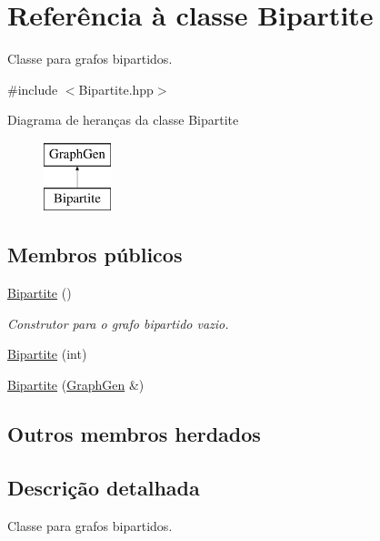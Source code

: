\hypertarget{classBipartite}{}\section{Referência à classe Bipartite}
\label{classBipartite}


Classe para grafos bipartidos.  




{\ttfamily \#include $<$Bipartite.\+hpp$>$}

Diagrama de heranças da classe Bipartite\begin{figure}[H]
\begin{center}
\leavevmode
\includegraphics[height=2.000000cm]{classBipartite}
\end{center}
\end{figure}
\subsection*{Membros públicos}
\begin{DoxyCompactItemize}
\item 
\mbox{\label{classBipartite_aebea5d6981f517fa57e073c7d5cd5fd5}} 
\hyperlink{classBipartite_aebea5d6981f517fa57e073c7d5cd5fd5}{Bipartite} ()
\begin{DoxyCompactList}\small\item\em Construtor para o grafo bipartido vazio. \end{DoxyCompactList}\item 
\hyperlink{classBipartite_a1dfec46c393c2c1b8141250d26968673}{Bipartite} (int)
\item 
\hyperlink{classBipartite_a5535fa6da516192c5ec964b37db63e55}{Bipartite} (\hyperlink{classGraphGen}{Graph\+Gen} \&)
\end{DoxyCompactItemize}
\subsection*{Outros membros herdados}


\subsection{Descrição detalhada}
Classe para grafos bipartidos. 


